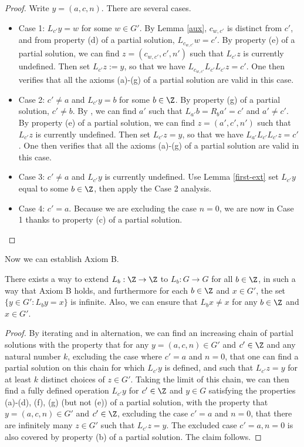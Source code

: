 \begin{proof} Write $y = (a,c,n)$. There are several cases.
  \begin{itemize}
    \item Case 1: $L_{c'} y = w$ for some $w \in G'$.  By Lemma \ref{aux}, $c_{w,c'}$ is distinct from $c'$, and from property (d) of a partial solution, $L_{c_{w,c'}} w = c'$.  By property (e) of a partial solution, we can find $z = (c_{w,c'}, c', n')$ such that $L_{c'} z$ is currently undefined.  Then set $L_{c'} z := y$, so that we have $L_{c_{w,c'}} L_{c'} L_{c'} z = c'$.  One then verifies that all the axioms (a)-(g) of a partial solution are valid in this case.
    \item Case 2: $c' \neq a$ and $L_{c'} y = b$ for some $b \in \Z$. By property (g) of a partial solution, $c' \neq b$.  By , we can find $a'$ such that $L_{a'} b = R_b a' = c'$ and $a' \neq c'$.  By property (e) of a partial solution, we can find $z = (a', c', n')$ such that $L_{c'} z$ is currently undefined.  Then set $L_{c'} z = y$, so that we have $L_{a'} L_{c'} L_{c'} z = c'$. One then verifies that all the axioms (a)-(g) of a partial solution are valid in this case.
    \item Case 3: $c' \neq a$ and $L_{c'} y$ is currently undefined.  Use Lemma \ref{first-ext} set $L_{c'} y$ equal to some $b \in \Z$, then apply the Case 2 analysis.
    \item Case 4: $c' = a$.  Because we are excluding the case $n=0$, we are now in Case 1 thanks to property (c) of a partial solution.
  \end{itemize}
\end{proof}


Now we can establish Axiom B.

\begin{proposition}\label{axiom-b}  There exists a way to extend $L_b: \Z \to \Z$ to $L_b: G \to G$ for all $b \in \Z$, in such a way that Axiom B holds, and furthermore for each $b \in \Z$ and $x \in G'$, the set $\{ y \in G': L_b y = x \}$ is infinite. Also, we can ensure that $L_b x \neq x$ for any $b \in \Z$ and $x \in G'$.
\end{proposition}

\begin{proof}
By iterating  and  in alternation, we can find an increasing chain of partial solutions with the property that for any $y = (a,c,n) \in G'$ and $c' \in \Z$ and any natural number $k$, excluding the case where $c'=a$ and $n=0$, that one can find a partial solution on this chain for which $L_{c'} y$ is defined, and such that $L_{c'} z = y$ for at least $k$ distinct choices of $z \in G'$.  Taking the limit of this chain, we can then find a fully defined operation $L_{c'} y$ for $c' \in \Z$ and $y \in G$ satisfying the properties (a)-(d), (f), (g) (but not (e)) of a partial solution, with the property that
$y = (a,c,n) \in G'$ and $c' \in \Z$, excluding the case $c'=a$ and $n=0$, that there are infinitely many $z \in G'$ such that $L_{c'} z = y$.  The excluded case $c'=a, n=0$ is also covered by property (b) of a partial solution.  The claim follows.
\end{proof}

